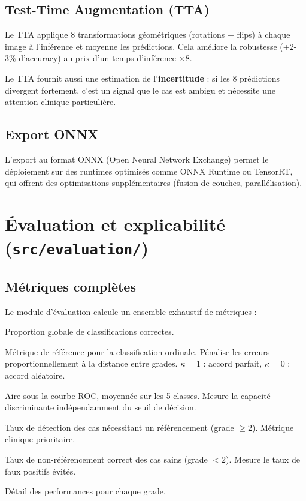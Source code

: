 \documentclass[11pt,a4paper]{article}
\begin{document}
\subsection{Test-Time Augmentation (TTA)}

Le TTA applique 8 transformations géométriques (rotations + flips) à chaque image à l'inférence et moyenne les prédictions. Cela améliore la robustesse (+2-3\% d'accuracy) au prix d'un temps d'inférence $\times 8$.

Le TTA fournit aussi une estimation de l'\textbf{incertitude} : si les 8 prédictions divergent fortement, c'est un signal que le cas est ambigu et nécessite une attention clinique particulière.

\subsection{Export ONNX}

L'export au format ONNX (Open Neural Network Exchange) permet le déploiement sur des runtimes optimisés comme ONNX Runtime ou TensorRT, qui offrent des optimisations supplémentaires (fusion de couches, parallélisation).

\section{Évaluation et explicabilité (\texttt{src/evaluation/})}

\subsection{Métriques complètes}

Le module d'évaluation calcule un ensemble exhaustif de métriques :

\begin{description}[leftmargin=2em]
  \item[Accuracy] Proportion globale de classifications correctes.
  \item[Quadratic Weighted Kappa] Métrique de référence pour la classification ordinale. Pénalise les erreurs proportionnellement à la distance entre grades. $\kappa = 1$ : accord parfait, $\kappa = 0$ : accord aléatoire.
  \item[AUC-ROC macro] Aire sous la courbe ROC, moyennée sur les 5 classes. Mesure la capacité discriminante indépendamment du seuil de décision.
  \item[Sensibilité ``referable''] Taux de détection des cas nécessitant un référencement (grade $\geq 2$). Métrique clinique prioritaire.
  \item[Spécificité ``referable''] Taux de non-référencement correct des cas sains (grade $< 2$). Mesure le taux de faux positifs évités.
  \item[Précision, Rappel, F1 par classe] Détail des performances pour chaque grade.
\end{description}
\end{document}
